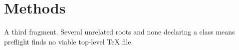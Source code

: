 \section{Methods}
A third fragment. Several unrelated roots and none declaring a class means
preflight finds no viable top-level TeX file.
